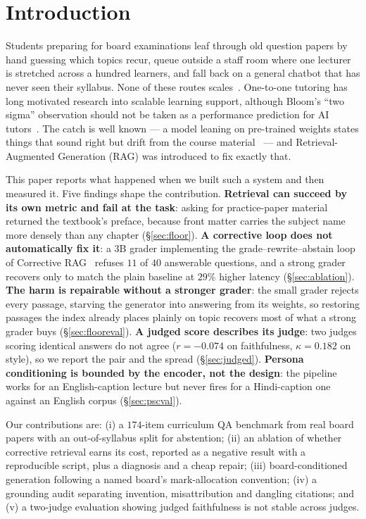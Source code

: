 \documentclass[conference]{IEEEtran}
\begin{document}
\section{Introduction}
Students preparing for board examinations leaf through old question papers by
hand guessing which topics recur, queue outside a staff room where one lecturer
is stretched across a hundred learners, and fall back on a general chatbot that
has never seen their syllabus. None of these routes scales~\cite{lauber2025}.
One-to-one tutoring has long motivated research into scalable learning support,
although Bloom's ``two sigma'' observation should not be taken as a performance
prediction for AI tutors~\cite{bloom1984,vanlehn2011}. The catch is well known
--- a model leaning on pre-trained weights states things that sound right but
drift from the course material~\cite{lewis2020} --- and Retrieval-Augmented
Generation (RAG) was introduced to fix exactly that.

This paper reports what happened when we built such a system and then measured
it. Five findings shape the contribution.
\textbf{Retrieval can succeed by its own metric and fail at the task}: asking
for practice-paper material returned the textbook's preface, because front
matter carries the subject name more densely than any chapter
(§\ref{sec:floor}). \textbf{A corrective loop does not automatically fix it}: a
$3$B grader implementing the grade--rewrite--abstain loop of Corrective
RAG~\cite{yan2024crag} refuses $11$ of $40$ answerable questions, and a strong
grader recovers only to match the plain baseline at $29\%$ higher latency
(§\ref{sec:ablation}). \textbf{The harm is repairable without a stronger
grader}: the small grader rejects every passage, starving the generator into
answering from its weights, so restoring passages the index already places
plainly on topic recovers most of what a strong grader buys
(§\ref{sec:flooreval}). \textbf{A judged score describes its judge}: two judges
scoring identical answers do not agree ($r = -0.074$ on faithfulness,
$\kappa = 0.182$ on style), so we report the pair and the spread
(§\ref{sec:judged}). \textbf{Persona conditioning is bounded by the encoder,
not the design}: the pipeline works for an English-caption lecture but never
fires for a Hindi-caption one against an English corpus (§\ref{sec:pscval}).

Our contributions are: (i) a $174$-item curriculum QA benchmark from real board
papers with an out-of-syllabus split for abstention; (ii) an ablation of whether
corrective retrieval earns its cost, reported as a negative result with a
reproducible script, plus a diagnosis and a cheap repair; (iii)
board-conditioned generation following a named board's mark-allocation
convention; (iv) a grounding audit separating invention, misattribution and
dangling citations; and (v) a two-judge evaluation showing judged faithfulness
is not stable across judges.
\end{document}
